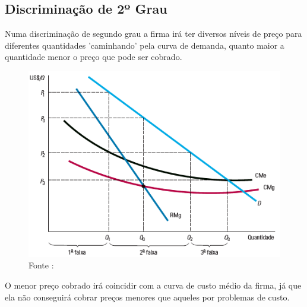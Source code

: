 \documentclass[12pt,a4paper,oneside,brazil]{abntex2}
\begin{document}
\subsection{Discriminação de 2º Grau}
Numa discriminação de segundo grau a firma irá ter diversos níveis de preço para diferentes quantidades 'caminhando' pela curva de demanda, quanto maior a quantidade menor o preço que pode ser cobrado.
\begin{figure}[h]
\includegraphics[scale=0.7]{Discriminação segundo grau.png}
\centering
\caption{Fonte : \cite[p. 399]{pindyck}}
\end{figure}
O menor preço cobrado irá coincidir com a curva de custo médio da firma, já que ela não conseguirá cobrar preços menores que aqueles por problemas de custo.
\end{document}
